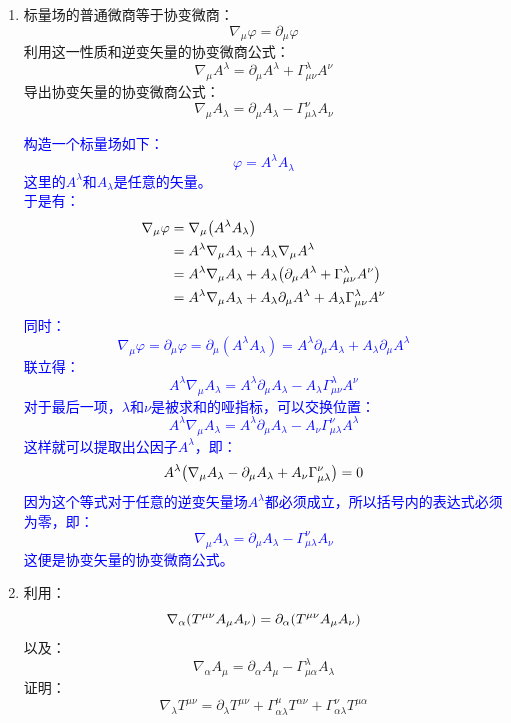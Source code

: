 \documentclass[a4paper]{article}
\begin{document}
\begin{enumerate}
    \item 标量场的普通微商等于协变微商：
    \[
        \nabla_\mu \varphi = \partial_\mu \varphi
    \]
    利用这一性质和逆变矢量的协变微商公式：
    \[
        \nabla_\mu A^\lambda = \partial_\mu A^\lambda + \Gamma^\lambda_{\mu\nu} A^\nu
    \]
    导出协变矢量的协变微商公式：
    \[
        \nabla_\mu A_\lambda = \partial_\mu A_\lambda - \Gamma^\nu_{\mu\lambda} A_\nu
    \]

    \textcolor{blue}{
    构造一个标量场如下：
    \[
        \varphi = A^\lambda A_\lambda
    \]
    这里的$A^\lambda$和$A_\lambda$是任意的矢量。 \\
    于是有：
    \begin{align*}
        \nabla_\mu \varphi
        &= \nabla_\mu \qty(A^\lambda A_\lambda) \\
        &= A^\lambda \nabla_\mu A_\lambda + A_\lambda \nabla_\mu A^\lambda \\
        &= A^\lambda \nabla_\mu A_\lambda + A_\lambda \qty(\partial_\mu A^\lambda + \Gamma^\lambda_{\mu\nu} A^\nu) \\
        &= A^\lambda \nabla_\mu A_\lambda + A_\lambda \partial_\mu A^\lambda + A_\lambda \Gamma^\lambda_{\mu\nu} A^\nu
    \end{align*}
    同时：
    \[
        \nabla_\mu \varphi = \partial_\mu \varphi = \partial_\mu (A^\lambda A_\lambda) = A^\lambda \partial_\mu A_\lambda + A_\lambda \partial_\mu A^\lambda
    \]
    联立得：
    \[
        A^\lambda \nabla_\mu A_\lambda = A^\lambda \partial_\mu A_\lambda - A_\lambda \Gamma^\lambda_{\mu\nu} A^\nu
    \]
    对于最后一项，$\lambda$和$\nu$是被求和的哑指标，可以交换位置：
    \[
        A^\lambda \nabla_\mu A_\lambda = A^\lambda \partial_\mu A_\lambda - A_\nu \Gamma^\nu_{\mu\lambda} A^\lambda
    \]
    这样就可以提取出公因子$A^\lambda$，即：
    \[
        A^\lambda \qty(\nabla_\mu A_\lambda - \partial_\mu A_\lambda + A_\nu \Gamma^\nu_{\mu\lambda}) = 0
    \]
    因为这个等式对于任意的逆变矢量场$A^\lambda$都必须成立，所以括号内的表达式必须为零，即：
    \[
        \nabla_\mu A_\lambda = \partial_\mu A_\lambda - \Gamma^\nu_{\mu\lambda} A_\nu
    \]
    这便是协变矢量的协变微商公式。
    }

    \item 利用：
    \[
        \nabla_\alpha \qty(T^{\mu\nu} A_\mu A_\nu) = \partial_\alpha \qty(T^{\mu\nu} A_\mu A_\nu)
    \]
    以及：
    \[
        \nabla_\alpha A_\mu = \partial_\alpha A_\mu - \Gamma^\lambda_{\mu\alpha} A_\lambda
    \]
    证明：
    \[
        \nabla_\lambda T^{\mu\nu} = \partial_\lambda T^{\mu\nu} + \Gamma^\mu_{\alpha\lambda} T^{\alpha\nu} + \Gamma^\nu_{\alpha\lambda} T^{\mu\alpha}
    \]


\end{enumerate}
\end{document}
